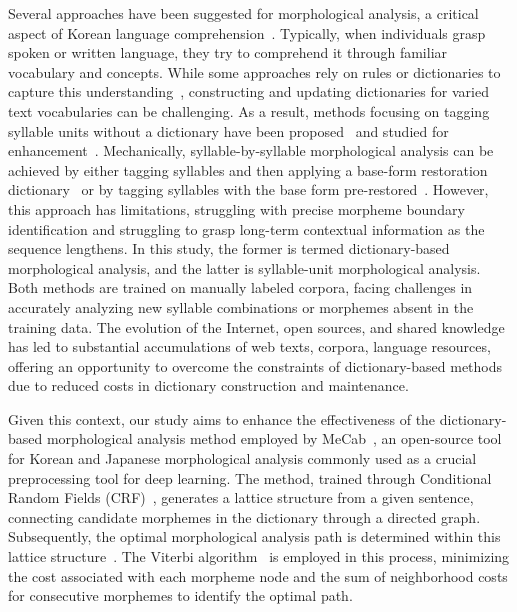 \documentclass[AMS,STIX2COL]{WileyNJD-v2}
\begin{document}
    Several approaches have been suggested for morphological analysis, a critical aspect of Korean language comprehension~\cite{KwonHC1991, LeeDG2009, ShimKS2011, LeeJS2011, ShinJC2012, LeeCK2013, NaSH2014, NaSH2015, HwangHS2016, KimHM2016, ChungES2016, LeeCH2016, Li2017, NaSH2018, KimSW2018, ChoiYS2018, MinJW2018, MinJW2019, KimHM2019, SongHJ2019, MinJW2020, SongHJ2020, ChoiYS2020, HwangHS2020, KimHJ2021, YounJY2021, MinJW2022, KimJM2022, ShinHJ2023}.
    Typically, when individuals grasp spoken or written language, they try to comprehend it through familiar vocabulary and concepts.
    While some approaches rely on rules or dictionaries to capture this understanding~\cite{KwonHC1991}, constructing and updating dictionaries for varied text vocabularies can be challenging.
    As a result, methods focusing on tagging syllable units without a dictionary have been proposed~\cite{ShimKS2011, LeeCK2013, LeeCH2016, KimHM2016} and studied for enhancement~\cite{KimSW2018, ChoiYS2018, KimHM2019, MinJW2019, SongHJ2019, SongHJ2020, YounJY2021, ShinHJ2023}.
    Mechanically, syllable-by-syllable morphological analysis can be achieved by either tagging syllables and then applying a base-form restoration dictionary~\cite{ShimKS2011, LeeCH2016} or by tagging syllables with the base form pre-restored~\cite{YounJY2021}.
    However, this approach has limitations, struggling with precise morpheme boundary identification and struggling to grasp long-term contextual information as the sequence lengthens.
    In this study, the former is termed dictionary-based morphological analysis, and the latter is syllable-unit morphological analysis.
    Both methods are trained on manually labeled corpora, facing challenges in accurately analyzing new syllable combinations or morphemes absent in the training data.
    The evolution of the Internet, open sources, and shared knowledge has led to substantial accumulations of web texts, corpora, language resources, offering an opportunity to overcome the constraints of dictionary-based methods due to reduced costs in dictionary construction and maintenance.

    Given this context, our study aims to enhance the effectiveness of the dictionary-based morphological analysis method employed by MeCab~\cite{MeCab}, an open-source tool for Korean and Japanese morphological analysis commonly used as a crucial preprocessing tool for deep learning.
    The method, trained through Conditional Random Fields (CRF)~\cite{Lafferty2001}, generates a lattice structure from a given sentence, connecting candidate morphemes in the dictionary through a directed graph.
    Subsequently, the optimal morphological analysis path is determined within this lattice structure~\cite{Kudo2004, NaSH2014, NaSH2018}.
    The Viterbi algorithm~\cite{Viterbi1967} is employed in this process, minimizing the cost associated with each morpheme node and the sum of neighborhood costs for consecutive morphemes to identify the optimal path.
\end{document}
